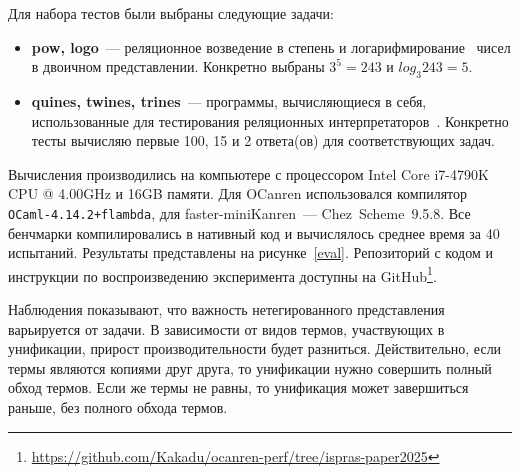 \FloatBarrier

Для набора тестов были выбраны следующие задачи:

\begin{itemize}
\item \textbf{pow, logo}~--- реляционное возведение в степень и логарифмирование~\cite{KiselyovArithm} чисел в двоичном представлении.
Конкретно выбраны $3^5=243$ и $log_3 243=5$.
\item \textbf{quines, twines, trines}~--- программы, вычисляющиеся в себя, использованные для тестирования реляционных интерпретаторов~\cite{Untagged}.
Конкретно тесты вычисляю первые 100, 15 и 2 ответа(ов) для соответствующих задач.
\end{itemize}


Вычисления производились на компьютере с процессором Intel Core i7-4790K CPU @ 4.00GHz и 16GB памяти.
Для OCanren использовался компилятор \texttt{OCaml-4.14.2+flambda}, для faster-miniKanren~--- Chez~Scheme~9.5.8.
Все бенчмарки компилировались в нативный код и вычислялось среднее время за 40 испытаний.
Результаты представлены на рисунке~\ref{eval}.
Репозиторий с кодом и инструкции по воспроизведению эксперимента доступны на GitHub\footnote{\url{https://github.com/Kakadu/ocanren-perf/tree/ispras-paper2025}}.

Наблюдения показывают, что важность нетегированного представления варьируется от задачи.
В зависимости от видов термов, участвующих в унификации, прирост производительности будет разниться.
Действительно, если термы являются копиями друг друга, то унификации нужно совершить полный обход термов. Если же термы не равны, то унификация может завершиться раньше, без полного обхода термов.

